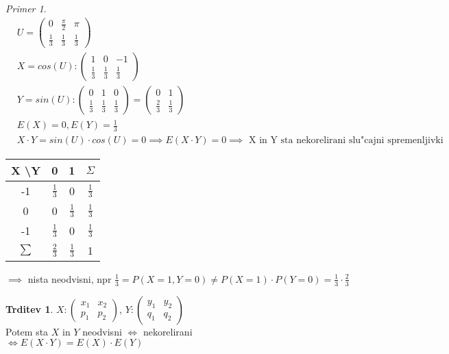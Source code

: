 \documentclass[a4paper,12pt]{article}
\theoremstyle{definition}
\newtheorem{claim}[counter]{Trditev}
\theoremstyle{remark}
\newtheorem*{ex}{Primer}
\begin{document}
\begin{ex}
    \begin{align*}
        &U = \begin{pmatrix}0 & \frac{\pi}{2} & \pi \\ \frac{1}{3} & \frac{1}{3} & \frac{1}{3}\end{pmatrix} \\
        &X = cos(U): \begin{pmatrix}1 & 0 & -1 \\ \frac{1}{3} & \frac{1}{3} & \frac{1}{3}\end{pmatrix} \\
        &Y = sin(U): \begin{pmatrix}0 & 1 & 0 \\ \frac{1}{3} & \frac{1}{3} & \frac{1}{3}\end{pmatrix} =
            \begin{pmatrix}0 & 1 \\ \frac{2}{3} & \frac{1}{3}\end{pmatrix} \\
        &E(X) = 0, E(Y) = \frac{1}{3} \\
        &X \cdot Y = sin(U) \cdot cos(U) = 0 \implies E(X \cdot Y) = 0 \implies \text{ X in Y sta nekorelirani
            slu"cajni spremenljivki}
    \end{align*}
    \begin{center}
        \begin{tabular}{ c | c c | c}
            X \textbackslash Y & 0 & 1 & $\Sigma$ \\
            \hline
            -1 & $\frac{1}{3}$ & 0 & $\frac{1}{3}$ \\
            0 & 0 & $\frac{1}{3}$ & $\frac{1}{3}$ \\
            -1 & $\frac{1}{3}$ & 0 & $\frac{1}{3}$ \\
            \hline
            $\sum$ & $\frac{2}{3}$ & $\frac{1}{3}$ & 1
        \end{tabular}
        $\implies$ nista neodvisni, npr $\frac{1}{3} = P(X=1,Y=0) \neq P(X=1) \cdot P(Y=0) = \frac{1}{3} \cdot \frac{2}{3}$
    \end{center}
\end{ex}

\begin{claim}
    $X: \begin{pmatrix}x_1 & x_2 \\ p_1 & p_2\end{pmatrix}$,
    $Y: \begin{pmatrix}y_1 & y_2 \\ q_1 & q_2\end{pmatrix}$ \\
    Potem sta $X$ in $Y$ neodvisni $\iff$ nekorelirani \\
    $\iff E(X \cdot Y) = E(X) \cdot E(Y)$   %
\end{claim}
\end{document}
